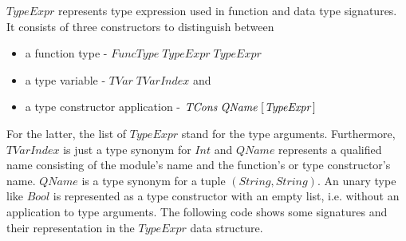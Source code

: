 \documentclass[%
	latex,%
	a4paper,%
	oneside,%
	chapterprefix,%
	headsepline,%
	12pt%
]{scrbook}
\newcommand{\Conid}[1]{\mathit{#1}}
\begin{document}
\ensuremath{\Conid{TypeExpr}} represents type expression used in function and data type
signatures. %
It consists of three constructors to distinguish between %
\begin{itemize}
\item a function type - \ensuremath{\Conid{FuncType}\;\Conid{TypeExpr}\;\Conid{TypeExpr}} 
\item a type variable  - \ensuremath{\Conid{TVar}\;\Conid{TVarIndex}} and 
\item a type constructor application - \ensuremath{\Conid{TCons}\;\Conid{QName}\;[\mskip1.5mu \Conid{TypeExpr}\mskip1.5mu]}
\end{itemize}

For the latter, the list of \ensuremath{\Conid{TypeExpr}} stand for the type arguments. %
Furthermore, \ensuremath{\Conid{TVarIndex}} is just a type synonym for \ensuremath{\Conid{Int}} and \ensuremath{\Conid{QName}}
represents a qualified name consisting of the module's name and the
function's or type constructor's name. %
\ensuremath{\Conid{QName}} is a type synonym for a tuple \ensuremath{(\Conid{String},\Conid{String})}. %
An unary type like \ensuremath{\Conid{Bool}} is represented as a type constructor with an
empty list, i.e. without an application to type arguments. %
The following code shows some signatures and their representation in
the \ensuremath{\Conid{TypeExpr}} data structure. %
\end{document}
